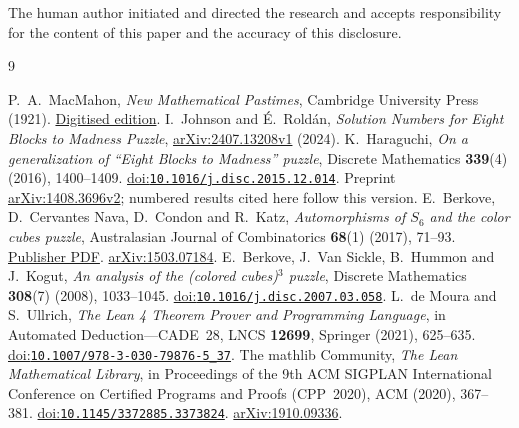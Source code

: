 \documentclass[11pt]{article}
\begin{document}
The human author initiated and directed the research and accepts
responsibility for the content of this paper and the accuracy of this
disclosure.

\begin{thebibliography}{9}
\raggedright
{} P.~A.~MacMahon,
\emph{New Mathematical Pastimes}, Cambridge University Press (1921).
\href{https://archive.org/details/newmathematicalp00macmuoft}{Digitised edition}.
 I.~Johnson and \'E.~Rold\'an,
\emph{Solution Numbers for Eight Blocks to Madness Puzzle},
\href{https://arxiv.org/abs/2407.13208v1}{arXiv:2407.13208v1} (2024).
 K.~Haraguchi,
\emph{On a generalization of ``Eight Blocks to Madness'' puzzle},
Discrete Mathematics \textbf{339}(4) (2016), 1400--1409.
\href{https://doi.org/10.1016/j.disc.2015.12.014}{doi:\nolinkurl{10.1016/j.disc.2015.12.014}}.
Preprint \href{https://arxiv.org/abs/1408.3696v2}{arXiv:1408.3696v2};
numbered results cited here follow this version.
 E.~Berkove, D.~Cervantes Nava, D.~Condon and R.~Katz,
\emph{Automorphisms of $S_6$ and the color cubes puzzle},
Australasian Journal of Combinatorics \textbf{68}(1) (2017), 71--93.
\href{https://ajc.maths.uq.edu.au/pdf/68/ajc_v68_p071.pdf}{Publisher PDF}.
\href{https://arxiv.org/abs/1503.07184}{arXiv:1503.07184}.
 E.~Berkove, J.~Van Sickle, B.~Hummon and J.~Kogut,
\emph{An analysis of the (colored cubes)$^3$ puzzle},
Discrete Mathematics \textbf{308}(7) (2008), 1033--1045.
\href{https://doi.org/10.1016/j.disc.2007.03.058}{doi:\nolinkurl{10.1016/j.disc.2007.03.058}}.
 L.~de Moura and S.~Ullrich,
\emph{The Lean 4 Theorem Prover and Programming Language},
in Automated Deduction---CADE~28, LNCS \textbf{12699}, Springer (2021),
625--635.
\href{https://doi.org/10.1007/978-3-030-79876-5_37}{doi:\nolinkurl{10.1007/978-3-030-79876-5_37}}.
 The mathlib Community,
\emph{The Lean Mathematical Library},
in Proceedings of the 9th ACM SIGPLAN International Conference on
Certified Programs and Proofs (CPP~2020), ACM (2020), 367--381.
\href{https://doi.org/10.1145/3372885.3373824}{doi:\nolinkurl{10.1145/3372885.3373824}}.
\href{https://arxiv.org/abs/1910.09336}{arXiv:1910.09336}.
\end{thebibliography}
\end{document}
